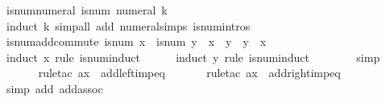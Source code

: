 \begin{isabellebody}
\isanewline
{}\isamarkupfalse%
\ is{\isacharunderscore}{\kern0pt}num{\isacharunderscore}{\kern0pt}numeral{\isacharcolon}{\kern0pt}\ {\isachardoublequoteopen}is{\isacharunderscore}{\kern0pt}num\ {\isacharparenleft}{\kern0pt}numeral\ k{\isacharparenright}{\kern0pt}{\isachardoublequoteclose}\isanewline
%
\isadelimproof
\ \ %
\endisadelimproof
%
\isatagproof
{}\isamarkupfalse%
\ {\isacharparenleft}{\kern0pt}induct\ k{\isacharparenright}{\kern0pt}\ {\isacharparenleft}{\kern0pt}simp{\isacharunderscore}{\kern0pt}all\ add{\isacharcolon}{\kern0pt}\ numeral{\isachardot}{\kern0pt}simps\ is{\isacharunderscore}{\kern0pt}num{\isachardot}{\kern0pt}intros{\isacharparenright}{\kern0pt}%
\endisatagproof
{\isafoldproof}%
%
\isadelimproof
\isanewline
%
\endisadelimproof
\isanewline
{}\isamarkupfalse%
\ is{\isacharunderscore}{\kern0pt}num{\isacharunderscore}{\kern0pt}add{\isacharunderscore}{\kern0pt}commute{\isacharcolon}{\kern0pt}\ {\isachardoublequoteopen}is{\isacharunderscore}{\kern0pt}num\ x\ {\isasymLongrightarrow}\ is{\isacharunderscore}{\kern0pt}num\ y\ {\isasymLongrightarrow}\ x\ {\isacharplus}{\kern0pt}\ y\ {\isacharequal}{\kern0pt}\ y\ {\isacharplus}{\kern0pt}\ x{\isachardoublequoteclose}\isanewline
%
\isadelimproof
\ \ %
\endisadelimproof
%
\isatagproof
{}\isamarkupfalse%
\ {\isacharparenleft}{\kern0pt}induct\ x\ rule{\isacharcolon}{\kern0pt}\ is{\isacharunderscore}{\kern0pt}num{\isachardot}{\kern0pt}induct{\isacharparenright}{\kern0pt}\isanewline
\ \ \ \ \isamarkupfalse%
\ {\isacharparenleft}{\kern0pt}induct\ y\ rule{\isacharcolon}{\kern0pt}\ is{\isacharunderscore}{\kern0pt}num{\isachardot}{\kern0pt}induct{\isacharparenright}{\kern0pt}\isanewline
\ \ \ \ \ \ \isamarkupfalse%
\ simp\isanewline
\ \ \ \ \ \isamarkupfalse%
\ {\isacharparenleft}{\kern0pt}rule{\isacharunderscore}{\kern0pt}tac\ a{\isacharequal}{\kern0pt}x\ \ add{\isacharunderscore}{\kern0pt}left{\isacharunderscore}{\kern0pt}imp{\isacharunderscore}{\kern0pt}eq{\isacharparenright}{\kern0pt}\isanewline
\ \ \ \ \ \isamarkupfalse%
\ {\isacharparenleft}{\kern0pt}rule{\isacharunderscore}{\kern0pt}tac\ a{\isacharequal}{\kern0pt}x\ \ add{\isacharunderscore}{\kern0pt}right{\isacharunderscore}{\kern0pt}imp{\isacharunderscore}{\kern0pt}eq{\isacharparenright}{\kern0pt}\isanewline
\ \ \ \ \ \isamarkupfalse%
\ {\isacharparenleft}{\kern0pt}simp\ add{\isacharcolon}{\kern0pt}\ add{\isachardot}{\kern0pt}assoc{\isacharparenright}{\kern0pt}\isanewline

\end{isabellebody}
